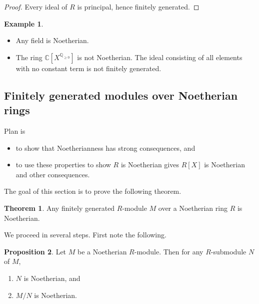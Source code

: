 \documentclass{article}
\newcommand{\Q}{\mathbb{Q}}
\newcommand{\C}{\mathbb{C}}
\renewcommand{\sb}[1]{\left[ #1 \right]}
\theoremstyle{definition}\newtheorem{definition}{Definition}[subsection]
\theoremstyle{definition}\newtheorem{remark}[definition]{Remark}
\theoremstyle{definition}\newtheorem*{example}{Example}
\theoremstyle{definition}\newtheorem*{note}{Note}
\newtheorem{proposition}[definition]{Proposition}
\newtheorem{theorem}[definition]{Theorem}
\begin{document}
\begin{proof}
Every ideal of $ R $ is principal, hence finitely generated.
\end{proof}

\begin{example}
\hfill
\begin{itemize}
\item Any field is Noetherian.
\item The ring $ \C\sb{X^{\Q_{\ge 0}}} $ is not Noetherian. The ideal consisting of all elements with no constant term is not finitely generated.
\end{itemize}
\end{example}

\subsection{Finitely generated modules over Noetherian rings}

Plan is
\begin{itemize}
\item to show that Noetherianness has strong consequences, and
\item to use these properties to show $ R $ is Noetherian gives $ R\sb{X} $ is Noetherian and other consequences.
\end{itemize}
The goal of this section is to prove the following theorem.

\begin{theorem}
\label{thm:8.2.1}
Any finitely generated $ R $-module $ M $ over a Noetherian ring $ R $ is Noetherian.
\end{theorem}

We proceed in several steps. First note the following.

\begin{proposition}
Let $ M $ be a Noetherian $ R $-module. Then for any $ R $-submodule $ N $ of $ M $,
\begin{enumerate}
\item $ N $ is Noetherian, and
\item $ M / N $ is Noetherian.
\end{enumerate}
\end{proposition}
\end{document}
